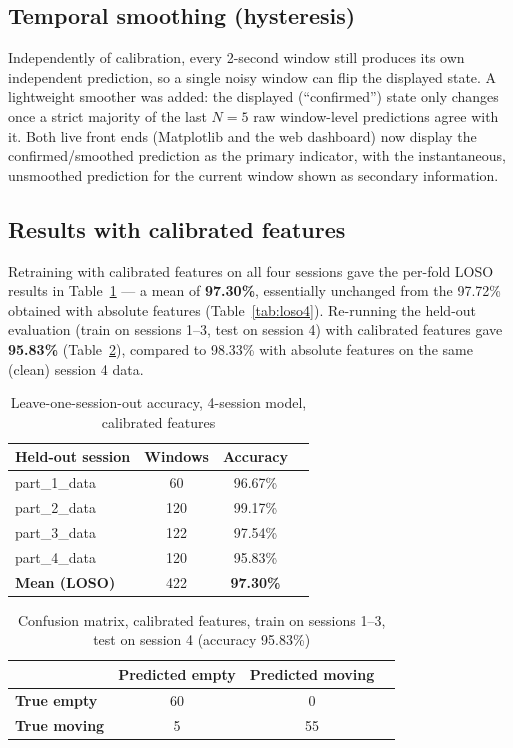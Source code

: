 \documentclass[11pt,a4paper]{article}
\begin{document}
\subsection{Temporal smoothing (hysteresis)}

Independently of calibration, every 2-second window still produces its
own independent prediction, so a single noisy window can flip the
displayed state. A lightweight smoother was added: the displayed
(``confirmed'') state only changes once a strict majority of the last
$N=5$ raw window-level predictions agree with it. Both live front ends
(Matplotlib and the web dashboard) now display the confirmed/smoothed
prediction as the primary indicator, with the instantaneous, unsmoothed
prediction for the current window shown as secondary information.

\subsection{Results with calibrated features}

Retraining with calibrated features on all four sessions gave the
per-fold LOSO results in Table~\ref{tab:loso4-calibrated} --- a mean of
\textbf{97.30\%}, essentially unchanged from the 97.72\% obtained with
absolute features (Table~\ref{tab:loso4}). Re-running the held-out
evaluation (train on sessions 1--3, test on session 4) with calibrated
features gave \textbf{95.83\%} (Table~\ref{tab:holdout-calibrated}),
compared to 98.33\% with absolute features on the same (clean) session
4 data.

\begin{table}[h]
\centering
\begin{tabular}{lccc}
\toprule
\textbf{Held-out session} & \textbf{Windows} & \textbf{Accuracy} \\
\midrule
part\_1\_data & 60  & 96.67\% \\
part\_2\_data & 120 & 99.17\% \\
part\_3\_data & 122 & 97.54\% \\
part\_4\_data & 120 & 95.83\% \\
\midrule
\textbf{Mean (LOSO)} & 422 & \textbf{97.30\%} \\
\bottomrule
\end{tabular}
\caption{Leave-one-session-out accuracy, 4-session model, calibrated features}
\label{tab:loso4-calibrated}
\end{table}

\begin{table}[h]
\centering
\begin{tabular}{lccc}
\toprule
 & \textbf{Predicted empty} & \textbf{Predicted moving} \\
\midrule
\textbf{True empty}  & 60 & 0 \\
\textbf{True moving} & 5  & 55 \\
\bottomrule
\end{tabular}
\caption{Confusion matrix, calibrated features, train on sessions 1--3, test on session 4 (accuracy 95.83\%)}
\label{tab:holdout-calibrated}
\end{table}
\end{document}
